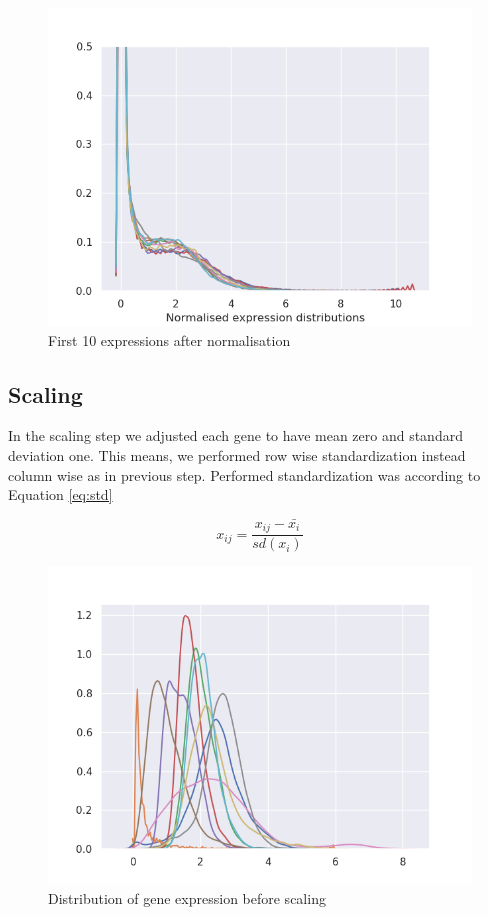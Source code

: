 \begin{figure}
    \centering
    \includegraphics[width=\linewidth]{images/norm_expr_dist.png}
    \caption{First 10 expressions after normalisation}
    \label{fig:norm_expr_dist}
\end{figure}

\subsection{Scaling}
In the scaling step we adjusted each gene to have mean zero and standard deviation one.
This means, we performed row wise standardization instead column wise as in previous step.
Performed standardization was according to Equation \ref{eq:std}

\begin{equation}
    x_{ij} = \frac{x_{ij}-\bar{x_{i}}}{sd(x_{i})}
    \label{eq:std}
\end{equation}



\begin{figure}
    \centering
    \includegraphics[width=\linewidth]{images/norm_expr_genes.png}
    \caption{Distribution of gene expression before scaling}
    \label{fig:norm_expr_genes}
\end{figure}

